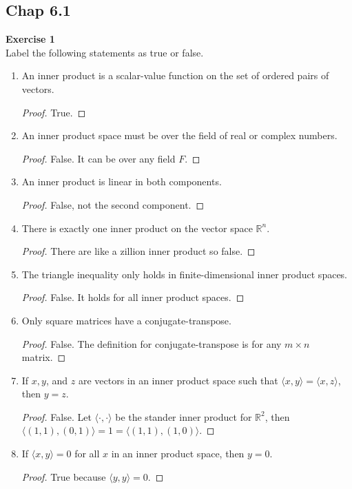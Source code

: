 \documentclass[12pt, a4paper]{article}
\theoremstyle{plain}
\newcommand{\R}{\mathbb{R}}
\newenvironment{exercise}[2][Exercise]
    { \begin{mdframed}[backgroundcolor=gray!20] \textbf{#1 #2} \\}
    {  \end{mdframed}}
\begin{document}
\subsection*{Chap 6.1}
\begin{exercise}{1}
Label the following statements as true or false.
\begin{enumerate}[label=(\alph*)]
\item An inner product is a scalar-value function on the set of ordered pairs of vectors.
\begin{proof}
True.
\end{proof}
\item An inner product space must be over the field of real or complex numbers.
	\begin{proof}
	False. It can be over any field $F$.
	\end{proof}
\item An inner product is linear in both components.
	\begin{proof}
	False, not the second component.
	\end{proof}
\item There is exactly one inner product on the vector space $\R^n$.
	\begin{proof}
	There are like a zillion inner product so false.
	\end{proof}
\item The triangle inequality only holds in finite-dimensional inner product spaces.
	\begin{proof}
	False. It holds for all inner product spaces.
	\end{proof}
\item Only square matrices have a conjugate-transpose.
	\begin{proof}
	False. The definition for conjugate-transpose is for any $m\times n$ matrix.
	\end{proof}
\item If $x,y$, and $z$ are vectors in an inner product space such that $\langle{x,y}\rangle=\langle{x,z}\rangle$, then $y=z$.
	\begin{proof}
	False. Let $\langle{\cdot ,\cdot }\rangle$ be the stander inner product for $\R^2$, then $\langle{(1,1),(0,1)}\rangle =1=\langle{(1,1),(1,0)}\rangle$.
	\end{proof}
\item If $\langle{x,y}\rangle=0$ for all $x$ in an inner product space, then $y=0$.
	\begin{proof}
	True because $\langle{y,y}\rangle=0$. 
	\end{proof}
\end{enumerate}
\end{exercise}
\end{document}
